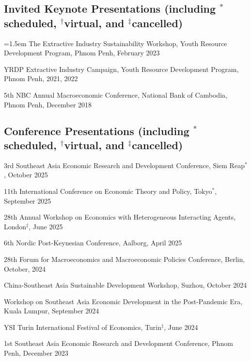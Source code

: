 \documentclass[10pt,a4paper]{article}
\begin{document}
	
\subsection*{Invited Keynote Presentations (including $^\ast$scheduled, $^\dag$virtual, and $^\ddag$cancelled)}

\hangindent=1.5em
The Extractive Industry Sustainability Workshop, Youth Resource Development Program, Phnom Penh, February 2023

YRDP Extractive Industry Campaign, Youth Resource Development Program, Phnom Penh, 2021, 2022

5th NBC Annual Macroeconomic Conference, National Bank of Cambodia, Phnom Penh, December 2018


\subsection*{Conference Presentations (including $^\ast$scheduled, $^\dag$virtual, and $^\ddag$cancelled)}

3rd Southeast Asia Economic Research and Development Conference, Siem Reap$^\ast$, October 2025

11th International Conference on Economic Theory and Policy, Tokyo$^\ast$, September 2025

28th Annual Workshop on Economics with Heterogeneous Interacting Agents, London$^\ddag$, June 2025

6th Nordic Post-Keynesian Conference, Aalborg, April 2025

28th Forum for Macroeconomics and Macroeconomic Policies Conference, Berlin, October, 2024

China-Southeast Asia Sustainable Development Workshop, Suzhou, October 2024

Workshop on Southeast Asia Economic Development in the Post-Pandemic Era, Kuala Lumpur, September 2024

YSI Turin International Festival of Economics, Turin$^\ddag$, June 2024

1st Southeast Asia Economic Research and Development Conference, Phnom Penh, December 2023
\end{document}

